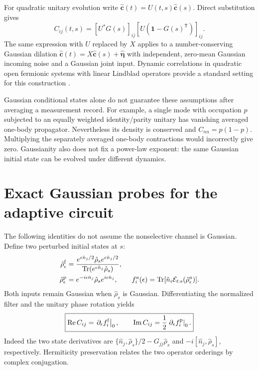 \documentclass[aps,prb,onecolumn,nofootinbib,superscriptaddress]{revtex4-2}
\begin{document}
For quadratic unitary evolution write
$\hat{\bm c}(t)=U(t,s)\hat{\bm c}(s)$. Direct substitution gives
\begin{equation}\boxed{
C_{ij}(t,s)=[U^*G(s)]_{ij}
 [U(\mathbf 1-G(s)^{\mathsf T})]_{ij}.}
\end{equation}
The same expression with $U$ replaced by $X$ applies to a number-conserving
Gaussian dilation $\hat{\bm c}(t)=X\hat{\bm c}(s)+\hat{\bm\eta}$
with independent, zero-mean Gaussian incoming noise and a Gaussian joint input.
Dynamic correlations in quadratic open fermionic systems with linear
Lindblad operators provide a standard setting for this construction
\cite{KosProsen}.

Gaussian conditional states alone do not guarantee these assumptions after
averaging a measurement record. For example, a single mode with occupation
$p$ subjected to an equally weighted identity/parity unitary has vanishing
averaged one-body propagator. Nevertheless its density is conserved and
$C_{nn}=p(1-p)$. Multiplying the separately averaged one-body contractions would
incorrectly give zero. Gaussianity also does not fix a power-law exponent:
the same Gaussian initial state can be evolved under different dynamics.

\section{Exact Gaussian probes for the adaptive circuit}
The following identities do not assume the nonselective channel is Gaussian.
Define two perturbed initial states at $s$:
\begin{align}
\hat\rho_\epsilon^{\rm f}
 &=\frac{e^{\epsilon\hat n_j/2}\hat\rho_s e^{\epsilon\hat n_j/2}}
 {\operatorname{Tr}(e^{\epsilon\hat n_j}\hat\rho_s)},\\
\hat\rho_\epsilon^{\rm p}
 &=e^{-i\epsilon\hat n_j}\hat\rho_s e^{i\epsilon\hat n_j},\qquad
f_i^{a}(\epsilon)=\operatorname{Tr}[\hat n_i\mathcal E_{t:s}(\hat\rho_\epsilon^{a})].
\end{align}
Both inputs remain Gaussian when $\hat\rho_s$ is Gaussian. Differentiating
the normalized filter and the unitary phase rotation yields
\begin{equation}\boxed{
\operatorname{Re}C_{ij}=\left.\partial_\epsilon f_i^{\rm f}\right|_0,
\qquad
\operatorname{Im}C_{ij}=\frac12\left.\partial_\epsilon f_i^{\rm p}\right|_0.}
\end{equation}
Indeed the two state derivatives are
$\{\hat n_j,\hat\rho_s\}/2-G_{jj}\hat\rho_s$ and
$-i[\hat n_j,\hat\rho_s]$, respectively. Hermiticity preservation relates
the two operator orderings by complex conjugation.
\end{document}
